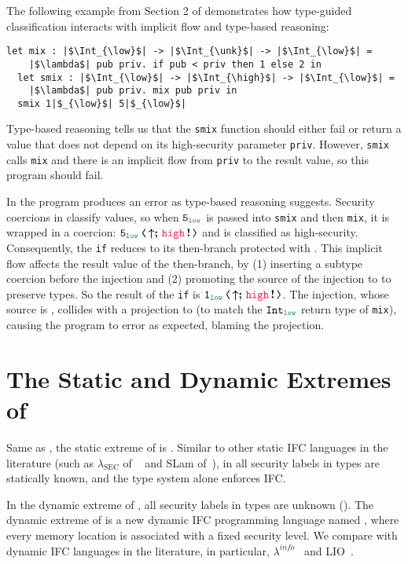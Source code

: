The following example from Section 2 of \textcite{Toro:2018aa} demonstrates how
type-guided classification interacts with implicit flow and type-based
reasoning:
\begin{lstlisting}[style=tt]
  let mix : |$\Int_{\low}$| -> |$\Int_{\unk}$| -> |$\Int_{\low}$| =
    |$\lambda$| pub priv. if pub < priv then 1 else 2 in
  let smix : |$\Int_{\low}$| -> |$\Int_{\high}$| -> |$\Int_{\low}$| =
    |$\lambda$| pub priv. mix pub priv in
  smix 1|$_{\low}$| 5|$_{\low}$|
\end{lstlisting}

\noindent Type-based reasoning tells us that the \texttt{smix} function should
either fail or return a value that does not depend on its high-security
parameter \texttt{priv}. However, \texttt{smix} calls \texttt{mix} and there is
an implicit flow from \texttt{priv} to the result value, so this program should
fail.

In \Surface the program produces an error as type-based reasoning suggests.
Security coercions in \CC classify values, so when $\key{5}_{\low}$ is passed
into \texttt{smix} and then \texttt{mix}, it is wrapped in a coercion:
$\cccast{\key{5}_{\low}}{\up\seq\inj{\high}}$ and is classified as
high-security.
%
Consequently, the \texttt{if} reduces to its then-branch protected with \high.
This implicit flow affects the result value of the then-branch, by (1) inserting
a subtype coercion before the injection and (2) promoting the source of the
injection to \high to preserve types. So the result of the \texttt{if} is
$\cccast{\key{1}_{\low}}{\up\seq\inj{\high}}$. The injection, whose source is
\high, collides with a projection to \low (to match the $\Int_{\low}$ return
type of \texttt{mix}), causing the program to error as expected, blaming the
projection.

\section{The Static and Dynamic Extremes of \Surface}
\label{sec:embedding}

Same as \GSLRef, the static extreme of \Surface is \SSLRef. Similar to other
static IFC languages in the literature (such as $\lambda_{\text{SEC}}$ of
~\textcite{zdancewic2002programming} and SLam of~\textcite{heintze1998slam}), in
\SSLRef all security labels in types are statically known, and the type system
alone enforces IFC.

 In the
dynamic extreme of \GSLRef, all security labels in types are unknown (\unk). The
dynamic extreme of \GSLRef is a new dynamic IFC programming language named
\DynIFC, where every memory location is associated with a fixed security level.
We compare \DynIFC with dynamic IFC languages in the literature, in particular,
$\lambda^{\textit{info}}$~\parencite{austin2009efficient} and
LIO~\parencite{STEFAN:2017ta}.

